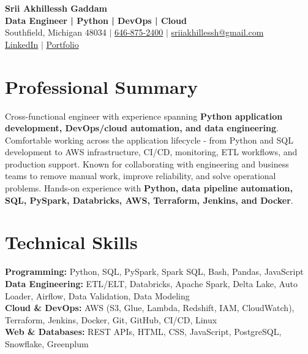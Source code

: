 \documentclass[letterpaper,10pt]{article}
\begin{document}
\fontsize{9.35pt}{10.45pt}\selectfont

\begin{center}
    {\LARGE \textbf{Srii Akhillessh Gaddam}} \\[-1pt]
    \textbf{Data Engineer | Python | DevOps | Cloud} \\[2pt]
    Southfield, Michigan 48034 $|$
    \href{tel:6468752400}{646-875-2400} $|$
    \href{mailto:sriiakhillessh@gmail.com}{sriiakhillessh@gmail.com} \\[1pt]
    \href{https://www.linkedin.com/in/srii-akhiilessh-gaddam-b48668191/}{LinkedIn} $|$
    \href{https://sriiakhillesshg.github.io/portfolio/}{Portfolio}
\end{center}
\vspace{-8pt}

\section{Professional Summary}
\small{Cross-functional engineer with experience spanning \textbf{Python application development, DevOps/cloud automation, and data engineering}. Comfortable working across the application lifecycle - from Python and SQL development to AWS infrastructure, CI/CD, monitoring, ETL workflows, and production support. Known for collaborating with engineering and business teams to remove manual work, improve reliability, and solve operational problems. Hands-on experience with \textbf{Python, data pipeline automation, SQL, PySpark, Databricks, AWS, Terraform, Jenkins, and Docker}.}

\section{Technical Skills}
\small{
\textbf{Programming:} Python, SQL, PySpark, Spark SQL, Bash, Pandas, JavaScript \\
\textbf{Data Engineering:} ETL/ELT, Databricks, Apache Spark, Delta Lake, Auto Loader, Airflow, Data Validation, Data Modeling \\
\textbf{Cloud \& DevOps:} AWS (S3, Glue, Lambda, Redshift, IAM, CloudWatch), Terraform, Jenkins, Docker, Git, GitHub, CI/CD, Linux \\
\textbf{Web \& Databases:} REST APIs, HTML, CSS, JavaScript, PostgreSQL, Snowflake, Greenplum
}

\end{document}
